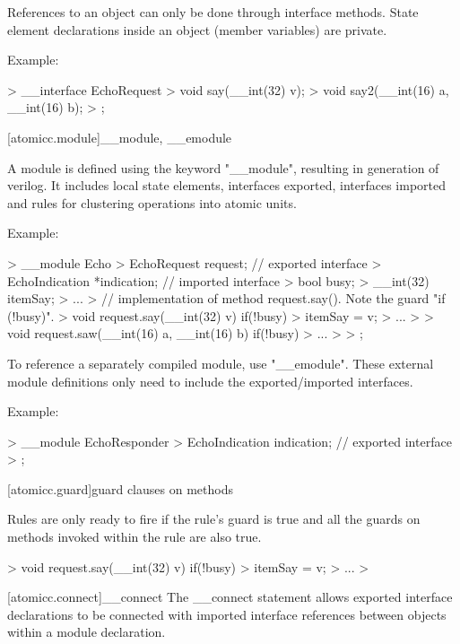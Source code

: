 References to an object can only be done through interface methods.  State element
declarations inside an object (member variables) are private.

Example:
\begin{codeblock}
>        __interface EchoRequest {
>            void say(__int(32) v);
>            void say2(__int(16) a, __int(16) b);
>        };
\end{codeblock}

[atomicc.module]{__module, __emodule}

A module is defined using the keyword "__module", resulting in generation of verilog.
It includes local state elements, interfaces exported, interfaces imported
and rules for clustering operations into atomic units.

Example:
\begin{codeblock}
>        __module Echo {
>            EchoRequest      request;               // exported interface
>            EchoIndication   *indication;           // imported interface
>            bool busy;
>            __int(32) itemSay;
>            ...
>            // implementation of method request.say(). Note the guard "if (!busy)".
>            void request.say(__int(32) v) if(!busy) {
>                itemSay = v;
>                ...
>            }
>            void request.saw(__int(16) a, __int(16) b) if(!busy) {
>                ...
>            }
>        };
\end{codeblock}

To reference a separately compiled module, use "__emodule".  These external
module definitions only need to include the exported/imported interfaces.

Example:
\begin{codeblock}
>        __module EchoResponder {
>            EchoIndication   indication;           // exported interface
>        };
\end{codeblock}

[atomicc.guard]{guard clauses on methods}

Rules are only ready to fire if the rule's guard is true and all the
guards on methods invoked within the rule are also true.

\begin{codeblock}
>            void request.say(__int(32) v) if(!busy) {
>                itemSay = v;
>                ...
>            }
\end{codeblock}

[atomicc.connect]{__connect}
The __connect statement allows exported interface declarations to be connected
with imported interface references between objects within a module declaration.

